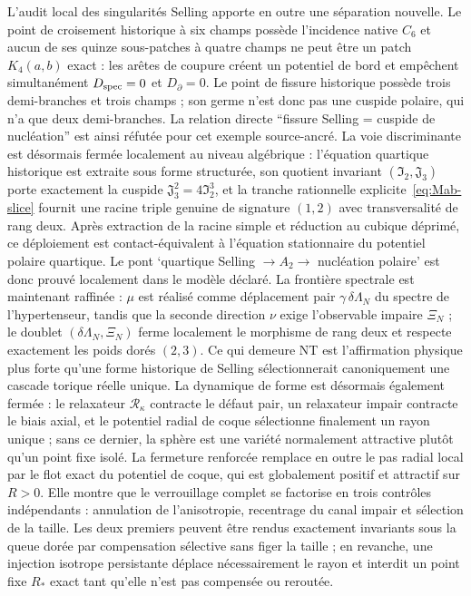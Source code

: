 \documentclass[11pt,a4paper]{article}
\begin{document}
L'audit local des singularités Selling apporte en outre une séparation nouvelle. Le point de croisement historique à six champs possède l'incidence native $C_6$ et aucun de ses quinze sous-patches à quatre champs ne peut être un patch $K_4(a,b)$ exact : les arêtes de coupure créent un potentiel de bord et empêchent simultanément $D_{\rm spec}=0$ et $D_\partial=0$. Le point de fissure historique possède trois demi-branches et trois champs ; son germe n'est donc pas une cuspide polaire, qui n'a que deux demi-branches. La relation directe ``fissure Selling = cuspide de nucléation'' est ainsi réfutée pour cet exemple source-ancré. La voie discriminante est désormais fermée localement au niveau algébrique : l'équation quartique historique est extraite sous forme structurée, son quotient invariant $(\mathfrak I_2,\mathfrak J_3)$ porte exactement la cuspide $\mathfrak J_3^2=4\mathfrak I_2^3$, et la tranche rationnelle explicite~\eqref{eq:Mab-slice} fournit une racine triple genuine de signature $(1,2)$ avec transversalité de rang deux. Après extraction de la racine simple et réduction au cubique déprimé, ce déploiement est contact-équivalent à l'équation stationnaire du potentiel polaire quartique. Le pont `quartique Selling $\to A_2\to$ nucléation polaire' est donc prouvé localement dans le modèle déclaré. La frontière spectrale est maintenant raffinée : $\mu$ est réalisé comme déplacement pair $\gamma\,\delta\Lambda_N$ du spectre de l'hypertenseur, tandis que la seconde direction $\nu$ exige l'observable impaire $\Xi_N$ ; le doublet $(\delta\Lambda_N,\Xi_N)$ ferme localement le morphisme de rang deux et respecte exactement les poids dorés $(2,3)$. Ce qui demeure NT est l'affirmation physique plus forte qu'une forme historique de Selling sélectionnerait canoniquement une cascade torique réelle unique. La dynamique de forme est désormais également fermée : le relaxateur $\mathcal R_\kappa$ contracte le défaut pair, un relaxateur impair contracte le biais axial, et le potentiel radial de coque sélectionne finalement un rayon unique ; sans ce dernier, la sphère est une variété normalement attractive plutôt qu'un point fixe isolé. La fermeture renforcée remplace en outre le pas radial local par le flot exact du potentiel de coque, qui est globalement positif et attractif sur $R>0$. Elle montre que le verrouillage complet se factorise en trois contrôles indépendants : annulation de l'anisotropie, recentrage du canal impair et sélection de la taille. Les deux premiers peuvent être rendus exactement invariants sous la queue dorée par compensation sélective sans figer la taille ; en revanche, une injection isotrope persistante déplace nécessairement le rayon et interdit un point fixe $R_*$ exact tant qu'elle n'est pas compensée ou reroutée.
\end{document}
